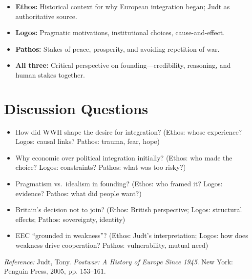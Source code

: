 \documentclass[11pt,a4paper]{article}
\begin{document}
\begin{itemize}
\item \textbf{Ethos:} Historical context for why European integration began; Judt as authoritative source.
\item \textbf{Logos:} Pragmatic motivations, institutional choices, cause-and-effect.
\item \textbf{Pathos:} Stakes of peace, prosperity, and avoiding repetition of war.
\item \textbf{All three:} Critical perspective on founding---credibility, reasoning, and human stakes together.
\end{itemize}

\section*{Discussion Questions}

\begin{itemize}
\item How did WWII shape the desire for integration? (Ethos: whose experience? Logos: causal links? Pathos: trauma, fear, hope)
\item Why economic over political integration initially? (Ethos: who made the choice? Logos: constraints? Pathos: what was too risky?)
\item Pragmatism vs.\ idealism in founding? (Ethos: who framed it? Logos: evidence? Pathos: what did people want?)
\item Britain's decision not to join? (Ethos: British perspective; Logos: structural effects; Pathos: sovereignty, identity)
\item EEC ``grounded in weakness''? (Ethos: Judt's interpretation; Logos: how does weakness drive cooperation? Pathos: vulnerability, mutual need)
\end{itemize}

\vspace{1em}
\noindent\footnotesize\textit{Reference:} Judt, Tony. \textit{Postwar: A History of Europe Since 1945}. New York: Penguin Press, 2005, pp. 153--161.
\end{document}
